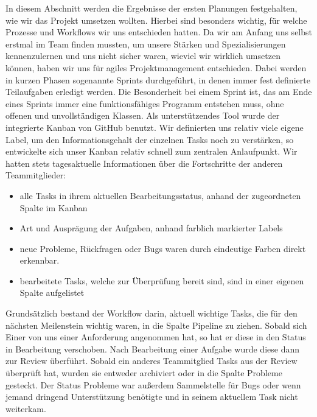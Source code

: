 \documentclass[10pt]{article}
\begin{document}
In diesem Abschnitt werden die Ergebnisse der ersten Planungen festgehalten, wie wir das Projekt umsetzen wollten. Hierbei sind besonders wichtig, für welche Prozesse und Workflows wir uns entschieden hatten. \newline
Da wir am Anfang uns selbst erstmal im Team finden mussten, um unsere Stärken und Spezialisierungen kennenzulernen und uns nicht sicher waren, wieviel wir wirklich umsetzen können, haben wir uns für agiles Projektmanagement entschieden. Dabei werden in kurzen Phasen sogenannte Sprints durchgeführt, in denen immer fest definierte Teilaufgaben erledigt werden. Die Besonderheit bei einem Sprint ist, das am Ende eines Sprints immer eine funktionsfähiges Programm entstehen muss, ohne offenen und unvollständigen Klassen. \newline
Als unterstützendes Tool wurde der integrierte Kanban von GitHub benutzt. Wir definierten uns relativ viele eigene Label, um den Informationsgehalt der einzelnen Tasks noch zu verstärken, so entwickelte sich unser Kanban relativ schnell zum zentralen Anlaufpunkt. Wir hatten stets tagesaktuelle Informationen über die Fortschritte der anderen Teammitglieder:
\begin{itemize}
	\item alle Tasks in ihrem aktuellen Bearbeitungsstatus, anhand der zugeordneten Spalte im Kanban
	\item Art und Ausprägung der Aufgaben, anhand farblich markierter Labels
	\item neue Probleme, Rückfragen oder Bugs waren durch eindeutige Farben direkt erkennbar.
	\item bearbeitete Tasks, welche zur Überprüfung bereit sind, sind in einer eigenen Spalte aufgelistet
\end{itemize}
Grundsätzlich bestand der Workflow darin, aktuell wichtige Tasks, die für den nächsten Meilenstein wichtig waren, in die Spalte \glqq Pipeline\grqq{} zu ziehen. Sobald sich Einer von uns einer Anforderung angenommen hat, so hat er diese in den Status \glqq in Bearbeitung\grqq{} verschoben. Nach Bearbeitung einer Aufgabe wurde diese dann zur \glqq Review\grqq{} überführt. Sobald ein anderes Teammitglied Tasks aus der \glqq Review\grqq{} überprüft hat, wurden sie entweder archiviert oder in die Spalte \glqq Probleme\grqq{} gesteckt. Der Status \glqq Probleme\grqq{} war außerdem Sammelstelle für Bugs oder wenn jemand dringend Unterstützung benötigte und in seinem aktuellem Task nicht weiterkam.

\newpage
\vspace{1cm}
\end{document}
